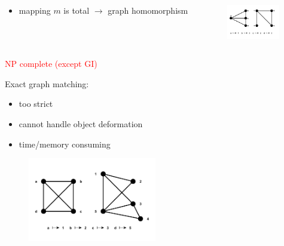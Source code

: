 \documentclass[hyperref={pdfpagelabels=false}]{beamer}
\begin{document}
\begin{frame}[allowframebreaks]
\begin{minipage}[0.2\textheight]{\textwidth}
	\begin{columns}[T]
		\begin{column}{0.6\textwidth}
			\begin{itemize}
			\item mapping $m$ is total\hspace{15pt} $\rightarrow$ graph homomorphism
			\end{itemize}
		\end{column}
		\begin{column}{0.3\textwidth}
			\begin{figure}[h!]
			    \centering
			    \includegraphics[width=2.3cm]{fig/homomorphism}
			\end{figure}
		\end{column}
	\end{columns}
\end{minipage}
\textcolor{red}{NP complete (except GI)~{\tiny\citep{Garey_NPComplet}}}

\framebreak
Exact graph matching:
\begin{itemize}
\item too strict
\item cannot handle object deformation
\item time/memory consuming
\end{itemize}
\begin{figure}[htb]
	\centering
	\includegraphics[width=0.5\textwidth]{fig/inexactGM}
\end{figure}
\end{frame}

\end{document}
